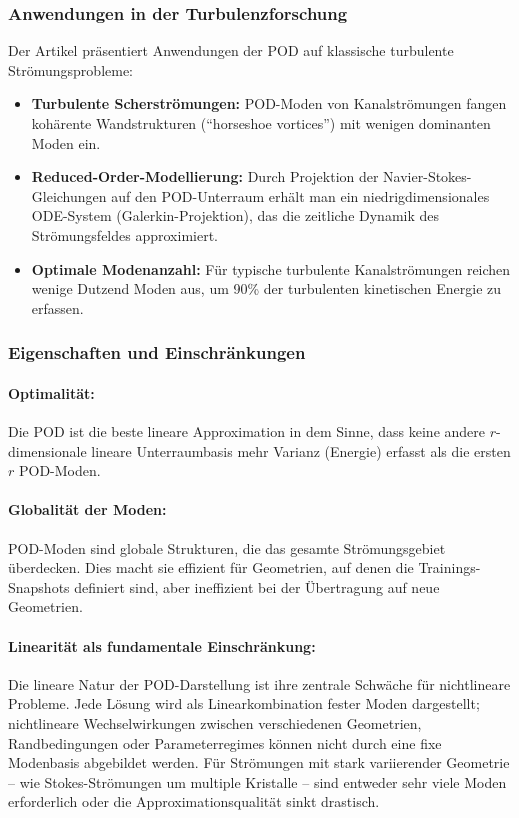 \documentclass[a4paper,12pt]{article}
\begin{document}
\subsubsection*{Anwendungen in der Turbulenzforschung}

Der Artikel präsentiert Anwendungen der POD auf klassische turbulente Strömungsprobleme:
\begin{itemize}
    \item \textbf{Turbulente Scherströmungen:} POD-Moden von Kanalströmungen fangen kohärente Wandstrukturen (``horseshoe vortices'') mit wenigen dominanten Moden ein.
    \item \textbf{Reduced-Order-Modellierung:} Durch Projektion der Navier-Stokes-Gleichungen auf den POD-Unterraum erhält man ein niedrigdimensionales ODE-System (Galerkin-Projektion), das die zeitliche Dynamik des Strömungsfeldes approximiert.
    \item \textbf{Optimale Modenanzahl:} Für typische turbulente Kanalströmungen reichen wenige Dutzend Moden aus, um 90\% der turbulenten kinetischen Energie zu erfassen.
\end{itemize}

\subsubsection*{Eigenschaften und Einschränkungen}

\paragraph{Optimalität:} Die POD ist die beste lineare Approximation in dem Sinne, dass keine andere $r$-dimensionale lineare Unterraumbasis mehr Varianz (Energie) erfasst als die ersten $r$ POD-Moden.

\paragraph{Globalität der Moden:} POD-Moden sind globale Strukturen, die das gesamte Strömungsgebiet überdecken. Dies macht sie effizient für Geometrien, auf denen die Trainings-Snapshots definiert sind, aber ineffizient bei der Übertragung auf neue Geometrien.

\paragraph{Linearität als fundamentale Einschränkung:} Die lineare Natur der POD-Darstellung ist ihre zentrale Schwäche für nichtlineare Probleme. Jede Lösung wird als Linearkombination fester Moden dargestellt; nichtlineare Wechselwirkungen zwischen verschiedenen Geometrien, Randbedingungen oder Parameterregimes können nicht durch eine fixe Modenbasis abgebildet werden. Für Strömungen mit stark variierender Geometrie -- wie Stokes-Strömungen um multiple Kristalle -- sind entweder sehr viele Moden erforderlich oder die Approximationsqualität sinkt drastisch.
\end{document}
